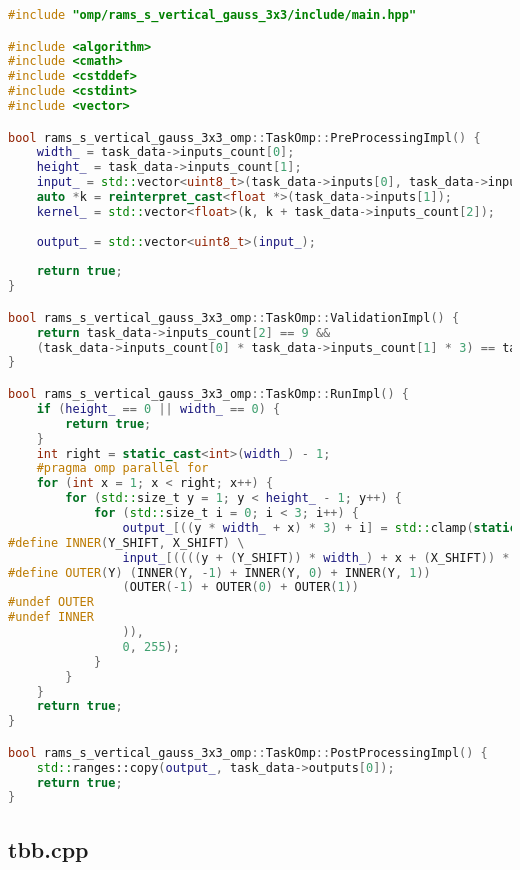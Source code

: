 \documentclass[12pt]{article}
\begin{document}
\begin{lstlisting}[language=C++]
#include "omp/rams_s_vertical_gauss_3x3/include/main.hpp"

#include <algorithm>
#include <cmath>
#include <cstddef>
#include <cstdint>
#include <vector>

bool rams_s_vertical_gauss_3x3_omp::TaskOmp::PreProcessingImpl() {
	width_ = task_data->inputs_count[0];
	height_ = task_data->inputs_count[1];
	input_ = std::vector<uint8_t>(task_data->inputs[0], task_data->inputs[0] + (height_ * width_ * 3));
	auto *k = reinterpret_cast<float *>(task_data->inputs[1]);
	kernel_ = std::vector<float>(k, k + task_data->inputs_count[2]);
	
	output_ = std::vector<uint8_t>(input_);
	
	return true;
}

bool rams_s_vertical_gauss_3x3_omp::TaskOmp::ValidationImpl() {
	return task_data->inputs_count[2] == 9 &&
	(task_data->inputs_count[0] * task_data->inputs_count[1] * 3) == task_data->outputs_count[0];
}

bool rams_s_vertical_gauss_3x3_omp::TaskOmp::RunImpl() {
	if (height_ == 0 || width_ == 0) {
		return true;
	}
	int right = static_cast<int>(width_) - 1;
	#pragma omp parallel for
	for (int x = 1; x < right; x++) {
		for (std::size_t y = 1; y < height_ - 1; y++) {
			for (std::size_t i = 0; i < 3; i++) {
				output_[((y * width_ + x) * 3) + i] = std::clamp(static_cast<int>(std::round(
#define INNER(Y_SHIFT, X_SHIFT) \
				input_[((((y + (Y_SHIFT)) * width_) + x + (X_SHIFT)) * 3) + i] * kernel_[4 + (3 * (Y_SHIFT)) + (X_SHIFT)]
#define OUTER(Y) (INNER(Y, -1) + INNER(Y, 0) + INNER(Y, 1))
				(OUTER(-1) + OUTER(0) + OUTER(1))
#undef OUTER
#undef INNER
				)),
				0, 255);
			}
		}
	}
	return true;
}

bool rams_s_vertical_gauss_3x3_omp::TaskOmp::PostProcessingImpl() {
	std::ranges::copy(output_, task_data->outputs[0]);
	return true;
}
\end{lstlisting}

\subsection{tbb.cpp}
\end{document}
